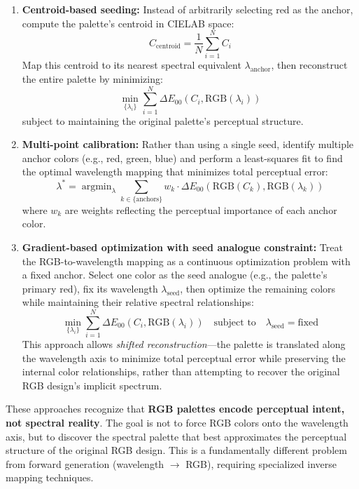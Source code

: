 \documentclass[12pt,a4paper]{article}
\DeclareMathOperator*{\argmin}{argmin}
\begin{document}
\begin{enumerate}
\item \textbf{Centroid-based seeding:} Instead of arbitrarily selecting red as the anchor, compute the palette's centroid in CIELAB space:
\begin{equation}
C_{\text{centroid}} = \frac{1}{N} \sum_{i=1}^{N} C_i
\end{equation}
Map this centroid to its nearest spectral equivalent $\lambda_{\text{anchor}}$, then reconstruct the entire palette by minimizing:
\begin{equation}
\min_{\{\lambda_i\}} \sum_{i=1}^{N} \Delta E_{00}(C_i, \text{RGB}(\lambda_i))
\end{equation}
subject to maintaining the original palette's perceptual structure.

\item \textbf{Multi-point calibration:} Rather than using a single seed, identify multiple anchor colors (e.g., red, green, blue) and perform a least-squares fit to find the optimal wavelength mapping that minimizes total perceptual error:
\begin{equation}
\lambda^* = \argmin_{\lambda} \sum_{k \in \{\text{anchors}\}} w_k \cdot \Delta E_{00}(\text{RGB}(C_k), \text{RGB}(\lambda_k))
\end{equation}
where $w_k$ are weights reflecting the perceptual importance of each anchor color.

\item \textbf{Gradient-based optimization with seed analogue constraint:} Treat the RGB-to-wavelength mapping as a continuous optimization problem with a fixed anchor. Select one color as the seed analogue (e.g., the palette's primary red), fix its wavelength $\lambda_{\text{seed}}$, then optimize the remaining colors while maintaining their relative spectral relationships:
\begin{equation}
\min_{\{\lambda_i\}} \sum_{i=1}^{N} \Delta E_{00}(C_i, \text{RGB}(\lambda_i)) \quad \text{subject to} \quad \lambda_{\text{seed}} = \text{fixed}
\end{equation}
This approach allows \emph{shifted reconstruction}—the palette is translated along the wavelength axis to minimize total perceptual error while preserving the internal color relationships, rather than attempting to recover the original RGB design's implicit spectrum.
\end{enumerate}

These approaches recognize that \textbf{RGB palettes encode perceptual intent, not spectral reality}. The goal is not to force RGB colors onto the wavelength axis, but to discover the spectral palette that best approximates the perceptual structure of the original RGB design. This is a fundamentally different problem from forward generation (wavelength $\to$ RGB), requiring specialized inverse mapping techniques.
\end{document}
